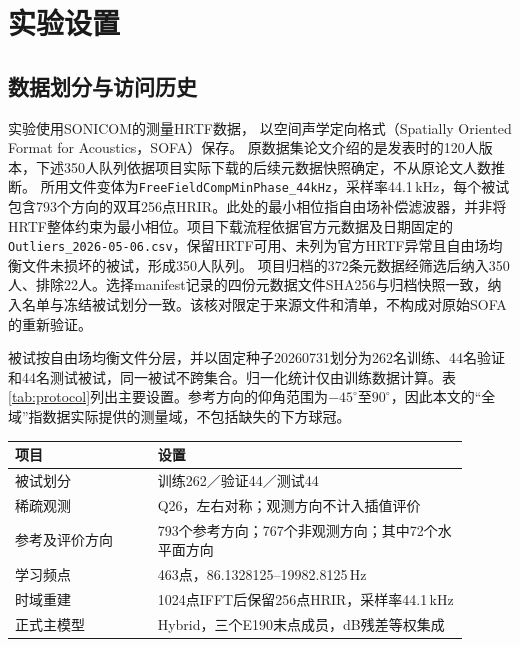 \section{实验设置}
\label{sec:setup}

\subsection{数据划分与访问历史}
实验使用SONICOM的测量HRTF数据\cite{R6}，%
以空间声学定向格式（Spatially Oriented Format for Acoustics，SOFA）保存\cite{R8}。%
原数据集论文介绍的是发表时的120人版本，下述350人队列依据项目实际下载的后续元数据快照确定，不从原论文人数推断。
所用文件变体为\texttt{FreeFieldCompMinPhase\_44kHz}，采样率44.1\,kHz，每个被试包含793个方向的双耳256点HRIR。此处的最小相位指自由场补偿滤波器，并非将HRTF整体约束为最小相位。项目下载流程依据官方元数据及日期固定的\texttt{Outliers\_2026-05-06.csv}，保留HRTF可用、未列为官方HRTF异常且自由场均衡文件未损坏的被试，形成350人队列。
项目归档的372条元数据经筛选后纳入350人、排除22人。选择manifest记录的四份元数据文件SHA256与归档快照一致，纳入名单与冻结被试划分一致。该核对限定于来源文件和清单，不构成对原始SOFA的重新验证。

被试按自由场均衡文件分层，并以固定种子20260731划分为262名训练、44名验证和44名测试被试，同一被试不跨集合。归一化统计仅由训练数据计算。表\ref{tab:protocol}列出主要设置。参考方向的仰角范围为$-45^\circ$至$90^\circ$，因此本文的“全域”指数据实际提供的测量域，不包括缺失的下方球冠。

\begin{table}[htbp]
\centering\small
{}
\begin{tabular}{p{0.29\linewidth}p{0.61\linewidth}}
\toprule
项目 & 设置\\
\midrule
被试划分 & 训练262／验证44／测试44\\
稀疏观测 & Q26，左右对称；观测方向不计入插值评价\\
参考及评价方向 & 793个参考方向；767个非观测方向；其中72个水平面方向\\
学习频点 & 463点，86.1328125--19982.8125\,Hz\\
时域重建 & 1024点IFFT后保留256点HRIR，采样率44.1\,kHz\\
正式主模型 & Hybrid，三个E190末点成员，dB残差等权集成\\
\bottomrule
\end{tabular}
\end{table}

